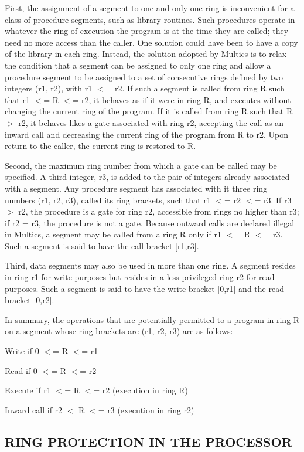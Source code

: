 First, the assignment of a segment to one and only one ring is inconvenient for
a class of procedure segments, such as library routines. Such procedures
operate in whatever the ring of execution the program is at the time they are
called; they need no more access than the caller.  One solution could have been
to have a copy of the library in each ring. Instead, the solution adopted by
Multics is to relax the condition that a segment can be assigned to only one
ring and allow a procedure segment to be assigned to a set of consecutive rings
defined by two integers (r1, r2), with r1 $<$= r2. If such a segment is called
from ring R such that r1 $<$= R $<$= r2, it behaves as if it were in ring R,
and executes without changing the current ring of the program. If it is called
from ring R such that R $>$ r2, it behaves likes a gate associated with ring
r2, accepting the call as an inward call and decreasing the current ring of the
program from R to r2. Upon return to the caller, the current ring is restored
to R.  

Second, the maximum ring number from which a gate can be called may be
specified. A third integer, r3, is added to the pair of integers already
associated with a segment. Any procedure segment has associated with it three
ring numbers (r1, r2, r3), called its ring brackets, such that r1 $<$= r2 $<$=
r3. If r3 $>$ r2, the procedure is a gate for ring r2, accessible from rings no
higher than r3; if r2 = r3, the procedure is not a gate. Because outward calls
are declared illegal in Multics, a segment may be called from a ring R only if
r1 $<$= R $<$= r3. Such a segment is said to have the call bracket [r1,r3].


Third, data segments may also be used in more than one ring. A segment resides
in ring r1 for write purposes but resides in a less privileged ring r2 for read
purposes. Such a segment is said to have the write bracket [0,r1] and the read
bracket [0,r2].


In summary, the operations that are potentially permitted to a program in ring
R on a segment whose ring brackets are (r1, r2, r3) are as follows:

Write if 0 $<$= R $<$= r1

Read if 0 $<$= R $<$= r2

Execute if r1 $<$= R $<$= r2 (execution in ring R)

Inward call if r2 $<$ R $<$= r3 (execution in ring r2) 

\subsection{RING PROTECTION IN THE PROCESSOR}

